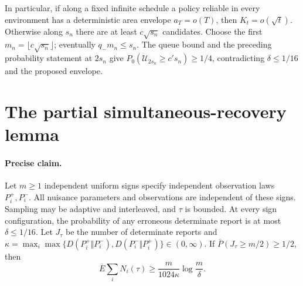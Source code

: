 In particular, if along a fixed infinite schedule a policy reliable in every
environment has a deterministic area envelope $a_T=o(T)$, then
$K_t=o(\sqrt t)$. Otherwise along $s_n$ there are at least $c\sqrt{s_n}$
candidates. Choose the first $m_n=\lfloor c\sqrt{s_n}\rfloor$; eventually
$q_-m_n\le s_n$. The queue bound and the preceding probability statement at
$2s_n$ give $P_0(\mathcal U_{2s_n}\ge c's_n)\ge1/4$, contradicting
$\delta\le1/16$ and the proposed envelope.

\section{The partial simultaneous-recovery lemma}
\label{app:partial}

\paragraph{Precise claim.}
Let $m\ge1$ independent uniform signs specify independent observation laws
$P_i^+,P_i^-$. All nuisance parameters and observations are independent of
these signs. Sampling may be adaptive and interleaved, and $\tau$ is bounded.
At every sign configuration, the probability of any erroneous determinate
report is at most $\delta\le1/16$. Let $J_\tau$ be the number of determinate
reports and
$\kappa=\max_i\max\{D(P_i^+\Vert P_i^-),D(P_i^-\Vert P_i^+)\}\in(0,\infty)$.
If $\overline P(J_\tau\ge m/2)\ge1/2$, then
\[
 \overline E\sum_iN_i(\tau)\ge\frac{m}{1024\kappa}\log\frac m\delta.
\]

